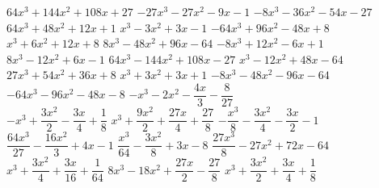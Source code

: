 \begin{esercizio}
\begin{htmulticols}{4}
\begin{enumeratea}
\end{enumeratea}
\end{htmulticols}
\noindent\! \(64 x^{3} + 144 x^{2} + 108 x + 27\) %
 \(- 27 x^{3} - 27 x^{2} - 9 x - 1\) %
 \(- 8 x^{3} - 36 x^{2} - 54 x - 27\) %
 \(64 x^{3} + 48 x^{2} + 12 x + 1\) %
 \(x^{3} - 3 x^{2} + 3 x - 1\) %
 \(- 64 x^{3} + 96 x^{2} - 48 x + 8\) %
 \(x^{3} + 6 x^{2} + 12 x + 8\) %
 \(8 x^{3} - 48 x^{2} + 96 x - 64\) %
 \(- 8 x^{3} + 12 x^{2} - 6 x + 1\)\\ %
 \(8 x^{3} - 12 x^{2} + 6 x - 1\) %
 \(64 x^{3} - 144 x^{2} + 108 x - 27\) %
 \(x^{3} - 12 x^{2} + 48 x - 64\) %
 \(27 x^{3} + 54 x^{2} + 36 x + 8\) %
 \(x^{3} + 3 x^{2} + 3 x + 1\) %
 \(- 8 x^{3} - 48 x^{2} - 96 x - 64\) %
 \(- 64 x^{3} - 96 x^{2} - 48 x - 8\) %
\sframeop{} \(- x^{3} - 2 x^{2} - \dfrac{4 x}{3} - \dfrac{8}{27}\) \\ %
 \(- x^{3}+\dfrac{3 x^{2}}{2}-\dfrac{3 x}{4}+\dfrac{1}{8}\)%
 \(x^{3}+\dfrac{9 x^{2}}{2}+\dfrac{27 x}{4}+\dfrac{27}{8}\)%
 \(- \dfrac{x^{3}}{8}-\dfrac{3 x^{2}}{4}-\dfrac{3 x}{2}-1\)\\%
 \(\dfrac{64 x^{3}}{27} - \dfrac{16 x^{2}}{3} + 4 x - 1\) %
\sframeop{} \(\dfrac{x^{3}}{64} - \dfrac{3 x^{2}}{8} + 3 x - 8\) %
 \(\dfrac{27 x^{3}}{8} - 27 x^{2} + 72 x - 64\) %
 \(x^{3}+\dfrac{3 x^{2}}{4}+\dfrac{3 x}{16}+\dfrac{1}{64}\)%
 \(8 x^{3} - 18 x^{2} + \dfrac{27 x}{2} - \dfrac{27}{8}\) %
 \(x^{3}+\dfrac{3 x^{2}}{2}+\dfrac{3 x}{4}+\dfrac{1}{8}\) %
\end{esercizio}

\pagebreak %

